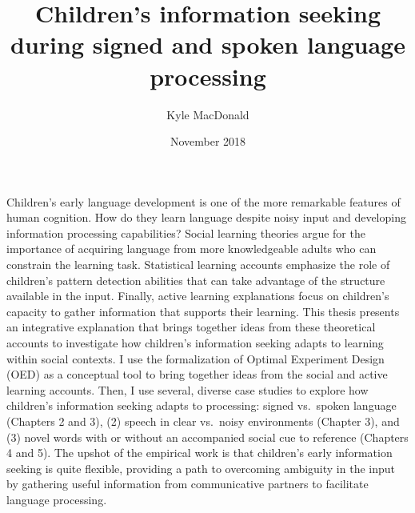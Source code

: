 \documentclass[oneside]{report}
\begin{document}
\title{Children's information seeking during signed and spoken language
processing}
\author{Kyle MacDonald}
\date{November 2018}


\makeatletter
\def\maxwidth{ %
  \ifdim\Gin@nat@width>\linewidth
    \linewidth
  \else
    \Gin@nat@width
  \fi
}
\makeatother

\renewcommand{\contentsname}{Contents}

\setlength{\parskip}{0pt}


\providecommand{\tightlist}{%
  \setlength{\itemsep}{0pt}\setlength{\parskip}{0pt}}




\beforepreface
{}
Children's early language development is one of the more remarkable
features of human cognition. How do they learn language despite noisy
input and developing information processing capabilities? Social
learning theories argue for the importance of acquiring language from
more knowledgeable adults who can constrain the learning task.
Statistical learning accounts emphasize the role of children's pattern
detection abilities that can take advantage of the structure available
in the input. Finally, active learning explanations focus on children's
capacity to gather information that supports their learning. This thesis
presents an integrative explanation that brings together ideas from
these theoretical accounts to investigate how children's information
seeking adapts to learning within social contexts. I use the
formalization of Optimal Experiment Design (OED) as a conceptual tool to
bring together ideas from the social and active learning accounts. Then,
I use several, diverse case studies to explore how children's
information seeking adapts to processing: signed vs.~spoken language
(Chapters 2 and 3), (2) speech in clear vs.~noisy environments (Chapter
3), and (3) novel words with or without an accompanied social cue to
reference (Chapters 4 and 5). The upshot of the empirical work is that
children's early information seeking is quite flexible, providing a path
to overcoming ambiguity in the input by gathering useful information
from communicative partners to facilitate language processing.
\end{document}
